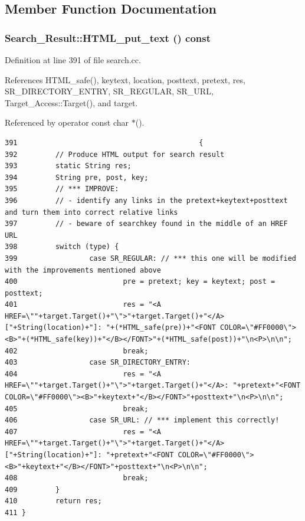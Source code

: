 \subsection{Member Function Documentation}
\subsubsection{ Search\_\-Result::HTML\_\-put\_\-text () const}\label{classSearch__Result_a5}




Definition at line 391 of file search.cc.

References HTML\_\-safe(), keytext, location, posttext, pretext, res, SR\_\-DIRECTORY\_\-ENTRY, SR\_\-REGULAR, SR\_\-URL, Target\_\-Access::Target(), and target.

Referenced by operator const char $\ast$().



\footnotesize\begin{verbatim}391                                           {
392         // Produce HTML output for search result
393         static String res;
394         String pre, post, key;
395         // *** IMPROVE:
396         // - identify any links in the pretext+keytext+posttext and turn them into correct relative links
397         // - beware of searchkey found in the middle of an HREF URL
398         switch (type) {
399                 case SR_REGULAR: // *** this one will be modified with the improvements mentioned above
400                         pre = pretext; key = keytext; post = posttext;
401                         res = "<A HREF=\""+target.Target()+"\">"+target.Target()+"</A> ["+String(location)+"]: "+(*HTML_safe(pre))+"<FONT COLOR=\"#FF0000\"><B>"+(*HTML_safe(key))+"</B></FONT>"+(*HTML_safe(post))+"\n<P>\n\n";
402                         break;
403                 case SR_DIRECTORY_ENTRY:
404                         res = "<A HREF=\""+target.Target()+"\">"+target.Target()+"</A>: "+pretext+"<FONT COLOR=\"#FF0000\"><B>"+keytext+"</B></FONT>"+posttext+"\n<P>\n\n";
405                         break;
406                 case SR_URL: // *** implement this correctly!
407                         res = "<A HREF=\""+target.Target()+"\">"+target.Target()+"</A> ["+String(location)+"]: "+pretext+"<FONT COLOR=\"#FF0000\"><B>"+keytext+"</B></FONT>"+posttext+"\n<P>\n\n";
408                         break;
409         }
410         return res;
411 }
\end{verbatim}\normalsize 
{}
